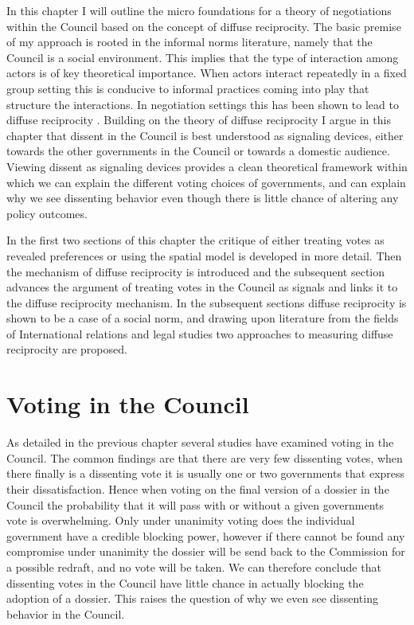 In this chapter I will outline the micro foundations for a theory of negotiations within the Council based on the concept of diffuse reciprocity. The basic premise of my approach is rooted in the informal norms literature, namely that the Council is a social environment. This implies that the type of interaction among actors is of key theoretical importance\citep{Johnston2001}. When actors interact repeatedly in a fixed group setting this is conducive to informal practices coming into play  that structure the interactions. In negotiation settings this has been shown to lead to diffuse reciprocity \citep{Jonsson2000}. Building on the theory of diffuse reciprocity I argue in this chapter that dissent in the Council is best understood as signaling devices, either towards the other governments in the Council or towards a domestic audience. Viewing dissent as signaling devices provides a clean theoretical framework within which we can explain the different voting choices of governments, and can explain why we see dissenting behavior even though there is little chance of altering any policy outcomes. 


In the first two sections of this chapter the critique of either treating votes as revealed preferences or using the spatial model is developed in more detail. Then the mechanism of diffuse reciprocity is introduced and the subsequent section advances the argument of treating votes in the Council as signals and links it to the diffuse reciprocity mechanism. In the subsequent sections diffuse reciprocity is shown to be a case of a social norm, and drawing upon literature from the fields of International relations and legal studies two approaches to measuring diffuse reciprocity are proposed. 

\section{Voting in the Council }

As detailed in the previous chapter several studies have examined voting in the Council. The common findings are that there are very few dissenting votes, when there finally is a dissenting vote it is usually one or two governments that express their dissatisfaction. Hence when voting on the final version of a dossier in the Council the probability that it will pass with or without a given governments vote is overwhelming. Only under unanimity voting does the individual government have a credible blocking power, however if there cannot be found any compromise under unanimity the dossier will be send back to the Commission for a possible redraft, and no vote will be taken. We can therefore conclude that dissenting votes in the Council have little chance in actually blocking the adoption of a dossier. This raises the question of why we even see dissenting behavior in the Council. 

